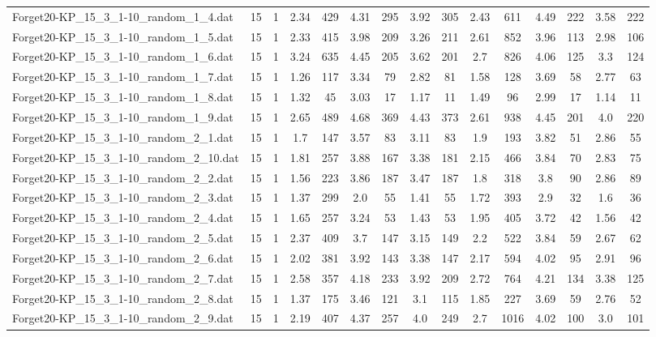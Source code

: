 \begin{table}[!ht]
{\begin{tabular}{lcccccccccccccc}
Forget20-KP\_15\_3\_1-10\_random\_1\_4.dat & 15 & 1 & 2.34 & 429 & 4.31 & 295 & 3.92 & 305 & 2.43 & 611 & 4.49 & 222 & 3.58 & 222 \\
Forget20-KP\_15\_3\_1-10\_random\_1\_5.dat & 15 & 1 & 2.33 & 415 & 3.98 & 209 & 3.26 & 211 & 2.61 & 852 & 3.96 & 113 & 2.98 & 106 \\
Forget20-KP\_15\_3\_1-10\_random\_1\_6.dat & 15 & 1 & 3.24 & 635 & 4.45 & 205 & 3.62 & 201 & 2.7 & 826 & 4.06 & 125 & 3.3 & 124 \\
Forget20-KP\_15\_3\_1-10\_random\_1\_7.dat & 15 & 1 & 1.26 & 117 & 3.34 & 79 & 2.82 & 81 & 1.58 & 128 & 3.69 & 58 & 2.77 & 63 \\
Forget20-KP\_15\_3\_1-10\_random\_1\_8.dat & 15 & 1 & 1.32 & 45 & 3.03 & 17 & 1.17 & 11 & 1.49 & 96 & 2.99 & 17 & 1.14 & 11 \\
Forget20-KP\_15\_3\_1-10\_random\_1\_9.dat & 15 & 1 & 2.65 & 489 & 4.68 & 369 & 4.43 & 373 & 2.61 & 938 & 4.45 & 201 & 4.0 & 220 \\
Forget20-KP\_15\_3\_1-10\_random\_2\_1.dat & 15 & 1 & 1.7 & 147 & 3.57 & 83 & 3.11 & 83 & 1.9 & 193 & 3.82 & 51 & 2.86 & 55 \\
Forget20-KP\_15\_3\_1-10\_random\_2\_10.dat & 15 & 1 & 1.81 & 257 & 3.88 & 167 & 3.38 & 181 & 2.15 & 466 & 3.84 & 70 & 2.83 & 75 \\
Forget20-KP\_15\_3\_1-10\_random\_2\_2.dat & 15 & 1 & 1.56 & 223 & 3.86 & 187 & 3.47 & 187 & 1.8 & 318 & 3.8 & 90 & 2.86 & 89 \\
Forget20-KP\_15\_3\_1-10\_random\_2\_3.dat & 15 & 1 & 1.37 & 299 & 2.0 & 55 & 1.41 & 55 & 1.72 & 393 & 2.9 & 32 & 1.6 & 36 \\
Forget20-KP\_15\_3\_1-10\_random\_2\_4.dat & 15 & 1 & 1.65 & 257 & 3.24 & 53 & 1.43 & 53 & 1.95 & 405 & 3.72 & 42 & 1.56 & 42 \\
Forget20-KP\_15\_3\_1-10\_random\_2\_5.dat & 15 & 1 & 2.37 & 409 & 3.7 & 147 & 3.15 & 149 & 2.2 & 522 & 3.84 & 59 & 2.67 & 62 \\
Forget20-KP\_15\_3\_1-10\_random\_2\_6.dat & 15 & 1 & 2.02 & 381 & 3.92 & 143 & 3.38 & 147 & 2.17 & 594 & 4.02 & 95 & 2.91 & 96 \\
Forget20-KP\_15\_3\_1-10\_random\_2\_7.dat & 15 & 1 & 2.58 & 357 & 4.18 & 233 & 3.92 & 209 & 2.72 & 764 & 4.21 & 134 & 3.38 & 125 \\
Forget20-KP\_15\_3\_1-10\_random\_2\_8.dat & 15 & 1 & 1.37 & 175 & 3.46 & 121 & 3.1 & 115 & 1.85 & 227 & 3.69 & 59 & 2.76 & 52 \\
Forget20-KP\_15\_3\_1-10\_random\_2\_9.dat & 15 & 1 & 2.19 & 407 & 4.37 & 257 & 4.0 & 249 & 2.7 & 1016 & 4.02 & 100 & 3.0 & 101 \\

\end{tabular}}
\end{table}
